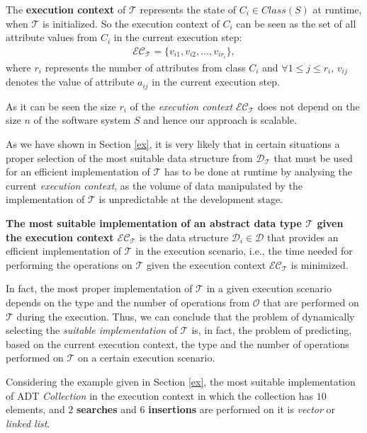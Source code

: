 The \textbf{execution context} of $\mathcal{T}$ represents the state of $C_{i} \in Class(S)$ at runtime, when $\mathcal{T}$ is initialized. So the execution context of $C_{i}$ can be seen as the set of all attribute values from $C_{i}$ in the current execution step:
\begin{align}
 \mathcal{EC}_\mathcal{T}=\{v_{i1}, v_{i2}, \dots , v_{ir_{i}} \},
\end{align}
where $r_{i}$ represents the number of attributes from class $C_{i}$ and $\forall 1 \leq j \leq r_{i}$, $v_{ij}$ denotes the value of attribute $a_{ij}$ in the current execution step. 

As it can be seen the size $r_{i}$ of the \emph{execution context} $\mathcal{EC}_\mathcal{T}$ does not depend on the size $n$ of the software system $S$ and hence our approach is scalable.

As we have shown in Section \ref{ex}, it is very likely that in certain situations a proper selection of the most suitable data structure from $\mathcal{D}_\mathcal{T}$ that must be used for an efficient implementation of $\mathcal{T}$ has to be done at runtime by analysing the current \emph{execution context}, as the volume of data manipulated by the implementation of $\mathcal{T}$ is unpredictable at the development stage.

\textbf{The most suitable implementation of an abstract data type $\mathcal{T}$ given the execution context $\mathcal{EC}_\mathcal{T}$} is the data structure $\mathcal{D}_i \in \mathcal{D}$ that provides an efficient implementation of $\mathcal{T}$ in the execution scenario, i.e., the time needed for performing the operations on $\mathcal{T}$ given the execution context $\mathcal{EC}_\mathcal{T}$ is minimized. 


In fact, the most proper implementation of $\mathcal{T}$  in a given execution scenario depends on the type and the number of operations from $\mathcal{O}$ that are performed on $\mathcal{T}$ during the execution. Thus, we can conclude that the problem of dynamically selecting the \emph{suitable implementation} of $\mathcal{T}$ is, in fact, the problem of predicting, based on the current execution context, the type and the number of operations performed on $\mathcal{T}$ on a certain execution scenario.


Considering the example given in Section \ref{ex}, the most suitable implementation of ADT \emph{Collection} in the execution context in which the collection has $10$ elements, and $2$ \textbf{searches} and $6$ \textbf{insertions} are performed on it is \emph{vector} or  \emph{linked list}.

